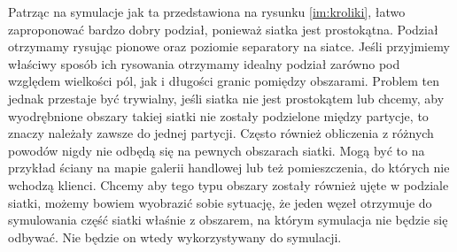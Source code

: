 Patrząc na symulacje jak ta przedstawiona na rysunku \ref{im:kroliki}, łatwo zaproponować bardzo dobry podział, ponieważ
siatka jest prostokątna.
Podział otrzymamy rysując pionowe oraz poziomie separatory na siatce.
Jeśli przyjmiemy właściwy sposób ich rysowania otrzymamy idealny podział zarówno pod względem wielkości pól, jak i
długości granic pomiędzy obszarami.
Problem ten jednak przestaje być trywialny, jeśli siatka nie jest prostokątem lub chcemy, aby wyodrębnione obszary takiej
siatki nie zostały podzielone między partycje, to znaczy należały zawsze do jednej partycji.
Często również obliczenia z różnych powodów nigdy nie odbędą się na pewnych obszarach siatki.
Mogą być to na przykład ściany na mapie galerii handlowej lub też pomieszczenia, do których nie wchodzą klienci.
Chcemy aby tego typu obszary zostały również ujęte w podziale siatki, możemy bowiem wyobrazić sobie sytuację, że
jeden węzeł otrzymuje do symulowania część siatki właśnie z obszarem, na którym symulacja nie będzie się odbywać.
Nie będzie on wtedy wykorzystywany do symulacji.
